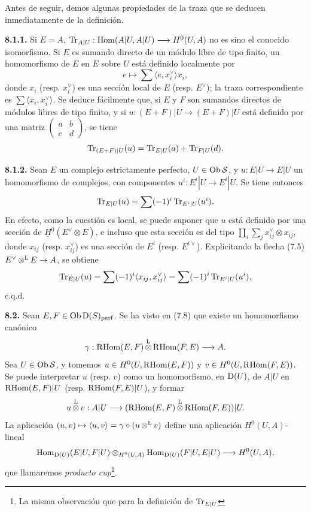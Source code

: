 Antes de seguir, demos algunas propiedades de la traza que se deducen inmediatamente de la definición.

\textbf{8.1.1.} Si \(E=A\), \(\Tr_{A|U}:\Hom(A|U,A|U)\longrightarrow H^0(U,A)\) no es sino el conocido isomorfismo. Si \(E\) es sumando directo de un módulo libre de tipo finito, un homomorfismo de \(E\) en \(E\) sobre \(U\) está definido localmente por
\[
  e\longmapsto \sum\langle e,x_i^\vee\rangle x_i,
\]
donde \(x_i\) (resp. \(x_i^\vee\)) es una sección local de \(E\) (resp. \(E^\vee\)); la traza correspondiente es \(\sum\langle x_i,x_i^\vee\rangle\). Se deduce fácilmente que, si \(E\) y \(F\) son sumandos directos de módulos libres de tipo finito, y si \(u:(E+F)|U\longrightarrow(E+F)|U\) está definido por una matriz \(\begin{pmatrix}a&b\\ c&d\end{pmatrix}\), se tiene
\[
  \Tr_{(E+F)|U}(u)=\Tr_{E|U}(a)+\Tr_{F|U}(d).
\]

\textbf{8.1.2.} Sean \(E\) un complejo estrictamente perfecto, \(U\in\Ob \sisi{S}{\mathcal S}\), y \(u:E|U\longrightarrow E|U\) un homomorfismo de complejos, con componentes \(u^i:E^i|U\to E^i|U\). Se tiene entonces
\[
  \Tr_{E|U}(u)=\sum(-1)^i\Tr_{E^i|U}(u^i).
\]
En efecto, como la cuestión es local, se puede suponer que \(u\) está definido por una sección de \(\underline H^0(E^\vee\otimes E)\), e incluso que esta sección es del tipo \(\coprod_i\sum_j x_{ij}^\vee\otimes x_{ij}\), donde \(x_{ij}\) (resp. \(x_{ij}^\vee\)) es una sección de \(E^i\) (resp. \(E^{i\vee}\)). Explicitando la flecha (7.5) \(E^\vee\otL E\to A\), se obtiene
\[
  \Tr_{E|U}(u)=\sum(-1)^i\langle x_{ij},x_{ij}^\vee\rangle
  =\sum(-1)^i\Tr_{E^i|U}(u^i),
\]
c.q.d.

\textbf{8.2.} Sean \(E,F\in\Ob\Dpx(S)_{\mathrm{parf}}\). Se ha visto en (7.8) que existe un homomorfismo canónico
\[
  \gamma:\RHom(E,F)\otL\RHom(F,E)\longrightarrow A.
\]
Sea \(U\in\Ob \sisi{S}{\mathcal S}\), y tomemos \(u\in H^0(U,\RHom(E,F))\) y \(v\in H^0(U,\RHom(F,E))\).
Se puede interpretar \(u\) (resp. \(v\)) como un homomorfismo, en \(\Dpx(U)\), de \(A|U\) en \(\RHom(E,F)|U\) (resp. \(\RHom(F,E)|U\)), y formar
\[
  u\otL v:A|U\longrightarrow(\RHom(E,F)\otL\RHom(F,E))|U.
\]
La aplicación \((u,v)\mapsto\langle u,v\rangle=\gamma\circ(u\otL v)\) define una aplicación \(H^0(U,A)\)-lineal
\[
  \Hom_{\Dpx(U)}(E|U,F|U)\otimes_{H^0(U,A)}\Hom_{\Dpx(U)}(F|U,E|U)
  \longrightarrow H^0(U,A),
\]
que llamaremos \emph{producto cup}\footnote{La misma observación que para la definición de \(\Tr_{E|U}\)}.

